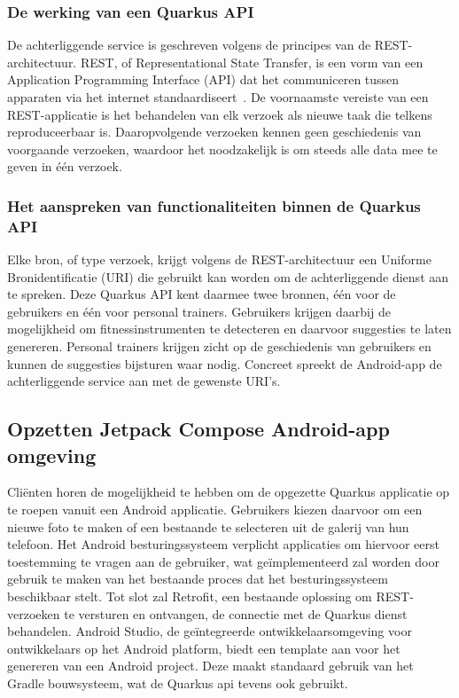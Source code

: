 \subsubsection{De werking van een Quarkus API}
\label{subsubsec:werking-api}
De achterliggende service is geschreven volgens de principes van de REST-architectuur.
REST, of Representational State Transfer, is een vorm van een Application Programming Interface (API) dat het communiceren tussen apparaten via het internet standaardiseert~\autocite{Doglio2018}.
De voornaamste vereiste van een REST-applicatie is het behandelen van elk verzoek als nieuwe taak die telkens reproduceerbaar is.
Daaropvolgende verzoeken kennen geen geschiedenis van voorgaande verzoeken, waardoor het noodzakelijk is om steeds alle data mee te geven in één verzoek.

\subsubsection{Het aanspreken van functionaliteiten binnen de Quarkus API}
Elke bron, of type verzoek, krijgt volgens de REST-architectuur een Uniforme Bronidentificatie (URI) die gebruikt kan worden om de achterliggende dienst aan te spreken.
Deze Quarkus API kent daarmee twee bronnen, één voor de gebruikers en één voor personal trainers.
Gebruikers krijgen daarbij de mogelijkheid om fitnessinstrumenten te detecteren en daarvoor suggesties te laten genereren.
Personal trainers krijgen zicht op de geschiedenis van gebruikers en kunnen de suggesties bijsturen waar nodig.
Concreet spreekt de Android-app de achterliggende service aan met de gewenste URI's.

\subsection{Opzetten Jetpack Compose Android-app omgeving}
\label{subsec:opzetten-jetpack-compose-android-app}
Cliënten horen de mogelijkheid te hebben om de opgezette Quarkus applicatie op te roepen vanuit een Android applicatie.
Gebruikers kiezen daarvoor om een nieuwe foto te maken of een bestaande te selecteren uit de galerij van hun telefoon.
Het Android besturingssysteem verplicht applicaties om hiervoor eerst toestemming te vragen aan de gebruiker, wat geïmplementeerd zal worden door gebruik te maken van het bestaande proces dat het besturingssysteem beschikbaar stelt.
Tot slot zal Retrofit, een bestaande oplossing om REST-verzoeken te versturen en ontvangen, de connectie met de Quarkus dienst behandelen.
Android Studio, de geïntegreerde ontwikkelaarsomgeving voor ontwikkelaars op het Android platform, biedt een template aan voor het genereren van een Android project.
Deze maakt standaard gebruik van het Gradle bouwsysteem, wat de Quarkus api tevens ook gebruikt.

